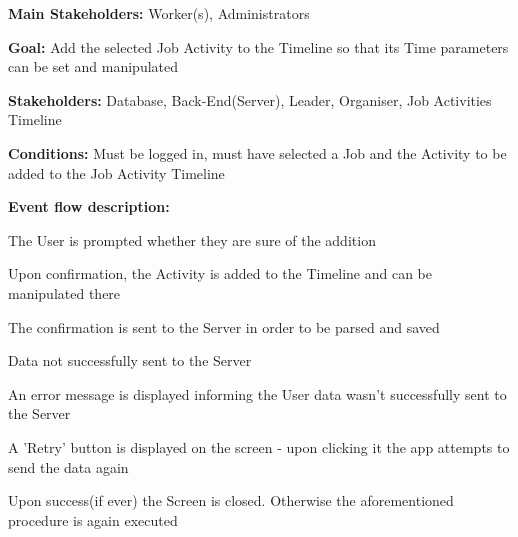 			\noindent {}
			\begin{packed_item}
				\item \textbf{Main Stakeholders:} Worker(s), Administrators
				\item \textbf{Goal:} Add the selected Job Activity to the Timeline so that its Time parameters can be set and manipulated
				\item \textbf{Stakeholders: } Database, Back-End(Server), Leader, Organiser, Job Activities Timeline
				\item \textbf{Conditions: } Must be logged in, must have selected a Job and the Activity to be added to the Job Activity Timeline
				\item \textbf{Event flow description: }
				\begin{packed_enum}
					\item The User is prompted whether they are sure of the addition
					\item Upon confirmation, the Activity is added to the Timeline and can be manipulated there
					\item The confirmation is sent to the Server in order to be parsed and saved
				\end{packed_enum}
				
				\begin{packed_item}
					\item[3.a] Data not successfully sent to the Server
					\item[] \begin{packed_enum}
						\item An error message is displayed informing the User data wasn't successfully sent to the Server
						\item A 'Retry' button is displayed on the screen - upon clicking it the app attempts to send the data again
						\item Upon success(if ever) the Screen is closed. Otherwise the aforementioned procedure is again executed
					\end{packed_enum}
				\end{packed_item}
			\end{packed_item}
		
